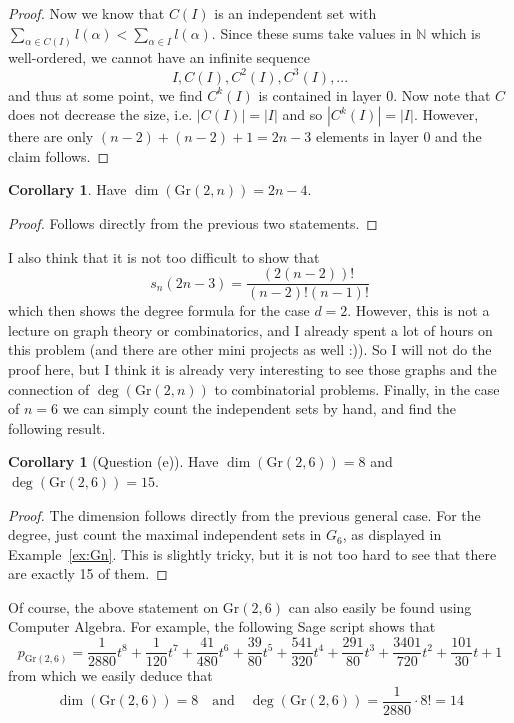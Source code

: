 \documentclass{scrartcl}
\newcommand{\N}{\mathbb{N}}
\newcommand{\Gr}{\mathrm{Gr}}
\theoremstyle{definition}
\newtheorem{corollary}[subsection]{Corollary}
\begin{document}
\begin{proof}
    Now we know that $C(I)$ is an independent set with $\sum_{\alpha \in C(I)} l(\alpha) < \sum_{\alpha \in I} l(\alpha)$.
    Since these sums take values in $\N$ which is well-ordered, we cannot have an infinite sequence
    \begin{equation*}
        I, C(I), C^2(I), C^3(I), ...
    \end{equation*}
    and thus at some point, we find $C^k(I)$ is contained in layer 0.
    Now note that $C$ does not decrease the size, i.e. $|C(I)| = |I|$ and so $|C^k(I)| = |I|$.
    However, there are only $(n - 2) + (n - 2) + 1 = 2n - 3$ elements in layer 0 and the claim follows.
\end{proof}
\begin{corollary}
    Have $\dim(\Gr(2, n)) = 2n - 4$.
\end{corollary}
\begin{proof}
    Follows directly from the previous two statements.
\end{proof}
I also think that it is not too difficult to show that
\begin{equation*}
    s_n(2n - 3) = \frac {(2(n - 2))!} {(n - 2)! (n - 1)!}
\end{equation*}
which then shows the degree formula for the case $d = 2$.
However, this is not a lecture on graph theory or combinatorics, and I already spent a lot of hours on this problem (and there are other mini projects as well :)).
So I will not do the proof here, but I think it is already very interesting to see those graphs and the connection of $\deg(\Gr(2, n))$ to combinatorial problems.
Finally, in the case of $n = 6$ we can simply count the independent sets by hand, and find the following result.
\begin{corollary}[Question (e)]
    Have $\dim(\Gr(2, 6)) = 8$ and $\deg(\Gr(2, 6)) = 15$.
\end{corollary}
\begin{proof}
    The dimension follows directly from the previous general case.
    For the degree, just count the maximal independent sets in $G_6$, as displayed in Example~\ref{ex:Gn}.
    This is slightly tricky, but it is not too hard to see that there are exactly 15 of them.
\end{proof}
Of course, the above statement on $\Gr(2, 6)$ can also easily be found using Computer Algebra.
For example, the following Sage script shows that
\begin{equation*}
    p_{\Gr(2, 6)} = \frac 1 {2880} t^8 + \frac 1 {120} t^7 + \frac {41} {480} t^6 + \frac {39} {80} t^5 + \frac {541} {320} t^4 + \frac {291} {80} t^3 + \frac {3401} {720} t^2 + \frac {101} {30} t + 1
\end{equation*}
from which we easily deduce that
\begin{equation*}
    \dim(\Gr(2, 6)) = 8 \quad \text{and} \quad \deg(\Gr(2, 6)) = \frac 1 {2880} \cdot 8! = 14
\end{equation*}

\printbibliography
\end{document}
